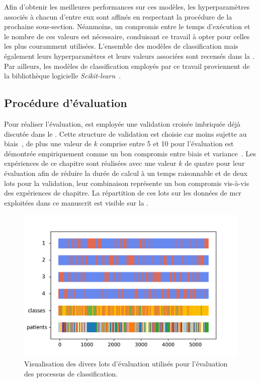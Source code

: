 Afin d'obtenir les meilleures performances sur ces modèles, les hyperparamètres associés à chacun d'entre eux sont affinés en respectant la procédure de la prochaine sous-section. Néanmoins, un compromis entre le temps d'exécution et le nombre de ces valeurs est nécessaire, conduisant ce travail à opter pour celles les plus couramment utilisées. L'ensemble des modèles de classification mais également leurs hyperparamètres et leurs valeurs associées sont recensés dans la . Par ailleurs, les modèles de classification employés par ce travail proviennent de la bibliothèque logicielle \textit{Scikit-learn}~\cite{pedregosa2011}.\par

\subsection{Procédure d'évaluation}
Pour réaliser l'évaluation, est employée une validation croisée imbriquée déjà discutée dans le . Cette structure de validation est choisie car moins sujette au biais~\cite{Cawley2010}, de plus une valeur de $k$ comprise entre 5 et 10 pour l'évaluation est démontrée empiriquement comme un bon compromis entre biais et variance~\cite{James2013}. Les expériences de ce chapitre sont réalisées avec une valeur $k$ de quatre pour leur évaluation afin de réduire la durée de calcul à un temps raisonnable et de deux lots pour la validation, leur combinaison représente un bon compromis vis-à-vis des expériences de chapitre. La répartition de ces lots sur les données de \gls{mcr} exploitées dans ce manuscrit est visible sur la .\par

\begin{figure}[H]
    \centering
    \includegraphics[width=0.8\linewidth]{contents/chapter_5/resources/visualisation_folds.png}
    \caption{Visualisation des divers lots d'évaluation utilisés pour l'évaluation des processus de classification.}
    \label{fig:visualisation_folds}
\end{figure}\par

